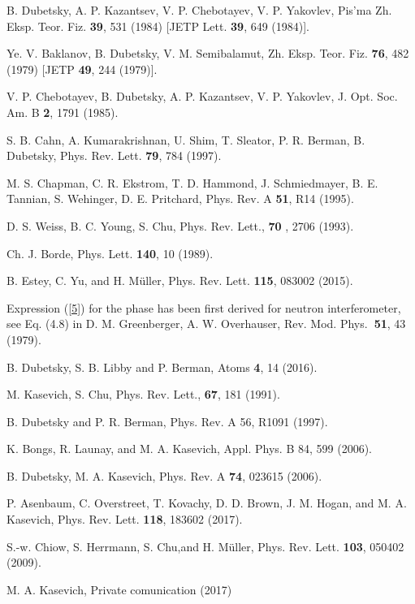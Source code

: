 \documentclass[twocolumn,showpacs,preprintnumbers]{revtex4}
\begin{document}
\begin{thebibliography}{99}
 B. Dubetsky, A. P. Kazantsev, V. P. Chebotayev, V. P. Yakovlev,
Pis'ma Zh. Eksp. Teor. Fiz. \textbf{39}, 531 (1984) [JETP Lett. \textbf{39},
649 (1984)].

 Ye. V. Baklanov, B. Dubetsky, V. M. Semibalamut, Zh. Eksp.
Teor. Fiz. \textbf{76}, 482 (1979) [JETP \textbf{49}, 244 (1979)].

 V. P. Chebotayev, B. Dubetsky, A. P. Kazantsev, V. P.
Yakovlev, J. Opt. Soc. Am. B \textbf{2}, 1791 (1985).

 S. B. Cahn, A. Kumarakrishnan, U. Shim, T. Sleator, P. R.
Berman, B. Dubetsky, Phys. Rev. Lett. \textbf{79}, 784 (1997).

 M. S. Chapman, C. R. Ekstrom, T. D. Hammond, J. Schmiedmayer,
B. E. Tannian, S. Wehinger, D. E. Pritchard, Phys. Rev. A \textbf{51}, R14
(1995).

 D. S. Weiss, B. C. Young, S. Chu, Phys. Rev. Lett., \textbf{70}%
, 2706 (1993).

 Ch. J. Borde, Phys. Lett. \textbf{140}, 10 (1989).

 B. Estey, C. Yu, and H. M\"{u}ller, Phys. Rev. Lett. \textbf{%
115}, 083002 (2015).

 Expression (\ref{5}) for the phase has been first derived for
neutron interferometer, see Eq. (4.8) in D. M. Greenberger, A. W.
Overhauser, Rev. Mod. Phys.\textbf{\ 51}, 43 (1979).

 B. Dubetsky, S. B. Libby and P. Berman, Atoms \textbf{4}, 14
(2016).

 M. Kasevich, S. Chu, Phys. Rev. Lett., \textbf{67}, 181 (1991).

 B. Dubetsky and P. R. Berman, Phys. Rev. A 56, R1091 (1997).

 K. Bongs, R. Launay, and M. A. Kasevich, Appl. Phys. B 84,
599 (2006).

 B. Dubetsky, M. A. Kasevich, Phys. Rev. A \textbf{74}, 023615
(2006).

 P. Asenbaum, C. Overstreet, T. Kovachy, D. D. Brown, J. M.
Hogan, and M. A. Kasevich, Phys. Rev. Lett. \textbf{118}, 183602 (2017).

 S.-w. Chiow, S. Herrmann, S. Chu,and H. M\"{u}ller, Phys.
Rev. Lett. \textbf{103}, 050402 (2009).

 M. A. Kasevich, Private comunication (2017)


\end{thebibliography}
\end{document}
